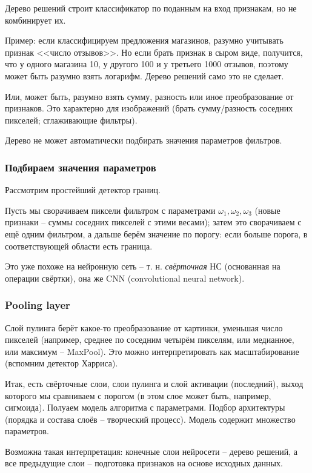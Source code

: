 \documentclass[main.tex]{subfiles}
\begin{document}
Дерево решений строит классификатор по поданным на вход признакам, но не комбинирует их.

Пример: если классифицируем предложения магазинов, разумно учитывать признак <<число отзывов>>.
Но если брать признак в сыром виде, получится, что у одного магазина 10, у другого 100 и у третьего 1000 отзывов, поэтому может быть разумно взять логарифм.
Дерево решений само это не сделает.

Или, может быть, разумно взять сумму, разность или иное преобразование от признаков.
Это характерно для изображений (брать сумму/разность соседних пикселей; сглаживающие фильтры).

Дерево не может автоматически подбирать значения параметров фильтров.

\subsubsection{Подбираем значения параметров}

Рассмотрим простейший детектор границ.

Пусть мы сворачиваем пиксели фильтром с параметрами $\omega_1, \omega_2, \omega_3$ (новые признаки -- суммы соседних пикселей с этими весами); затем это сворачиваем с ещё одним фильтром, а дальше берём значение по порогу: если больше порога, в соответствующей области есть граница.

Это уже похоже на нейронную сеть -- т. н. \emph{свёрточная} НС (основанная на операции свёртки), она же CNN (convolutional neural network).

\subsubsection{Pooling layer}

Слой пулинга берёт какое-то преобразование от картинки, уменьшая число пикселей (например, среднее по соседним четырём пикселям, или медианное, или максимум -- MaxPool).
Это можно интерпретировать как масштабирование (вспомним детектор Харриса).

Итак, есть свёрточные слои, слои пулинга и слой активации (последний), выход которого мы сравниваем с порогом (в этом слое может быть, например, сигмоида).
Полуаем модель алгоритма с параметрами.
Подбор архитектуры (порядка и состава слоёв -- творческий процесс).
Модель содержит множество параметров.

Возможна такая интерпретация: конечные слои нейросети -- дерево решений, а все предыдущие слои -- подготовка признаков на основе исходных данных. \\
\end{document}
